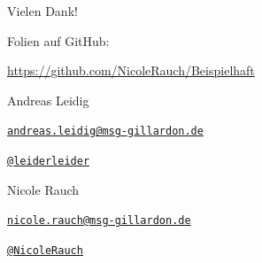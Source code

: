 {
\begin{frame}{Vielen Dank!}

        Folien auf GitHub:
        \begin{center}
                \url{https://github.com/NicoleRauch/Beispielhaft}
        \end{center}

        \begin{block}{Andreas Leidig}
        \begin{description}[Twitterxx]
                \item[E-Mail]  \href{mailto:andreas.leidig@msg-gillardon.de}{\texttt{andreas.leidig@msg-gillardon.de}}
                \item[Twitter] \href{http://twitter.com/leiderleider}{\texttt{@leiderleider}}
        \end{description}
        \end{block}

        \begin{block}{Nicole Rauch}
        \begin{description}[Twitterxx]
                \item[E-Mail]  \href{mailto:nicole.rauch@msg-gillardon.de}{\texttt{nicole.rauch@msg-gillardon.de}}
                \item[Twitter] \href{http://twitter.com/NicoleRauch}{\texttt{@NicoleRauch}}
        \end{description}
        \end{block}
\end{frame}
}
